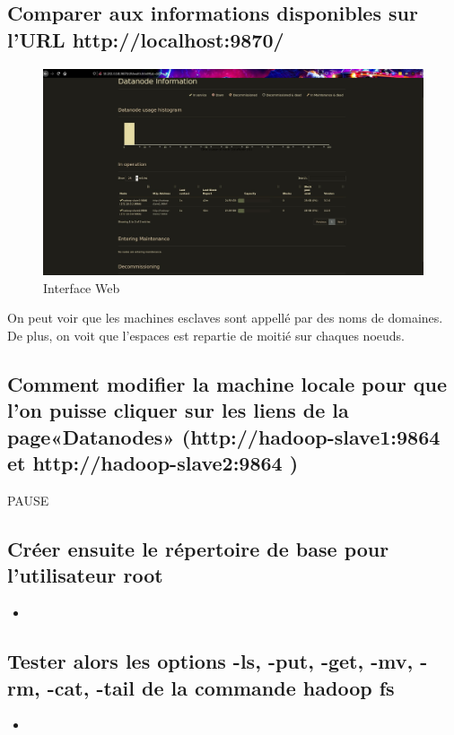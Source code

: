 \documentclass[10pt,a4paper]{article}
\newcommand{\insertcode}[2]{\begin{itemize}\item[]\end{itemize}}
\begin{document}
\subsection{Comparer aux informations disponibles sur l’URL http://localhost:9870/}
\begin{figure}[h!]
\centering
\includegraphics[scale=0.20]{image/1.jpg}
\caption{Interface Web }
\label{fig:net }
\end{figure}
On peut voir que les machines esclaves sont appellé par des noms de domaines. De plus, on voit que l'espaces est repartie de moitié sur chaques noeuds.

\subsection{Comment   modifier   la   machine   locale   pour   que   l’on   puisse   cliquer   sur   les   liens   de   la   page«Datanodes» (http://hadoop-slave1:9864 et http://hadoop-slave2:9864 ) }

PAUSE

\subsection{Créer ensuite le répertoire de base pour l’utilisateur root}
\insertcode{commande/7.txt}{Creation du FS }

\subsection{Tester alors les options -ls, -put, -get, -mv, -rm, -cat, -tail de la commande hadoop fs}
\insertcode{commande/8.txt}{Manipulation du FS }
\end{document}
